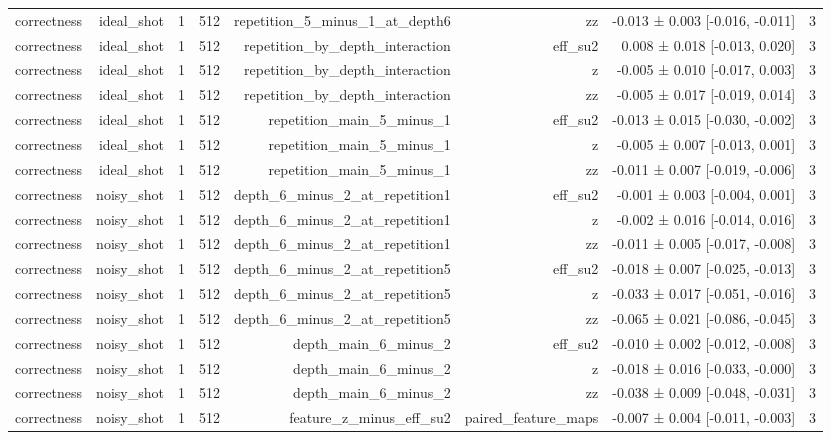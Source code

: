 \begin{table}
\begin{tabular}{lrrrrrrr}
correctness & ideal\_shot & 1 & 512 & repetition\_5\_minus\_1\_at\_depth6 & zz & -0.013 ± 0.003 [-0.016, -0.011] & 3 \\
correctness & ideal\_shot & 1 & 512 & repetition\_by\_depth\_interaction & eff\_su2 & 0.008 ± 0.018 [-0.013, 0.020] & 3 \\
correctness & ideal\_shot & 1 & 512 & repetition\_by\_depth\_interaction & z & -0.005 ± 0.010 [-0.017, 0.003] & 3 \\
correctness & ideal\_shot & 1 & 512 & repetition\_by\_depth\_interaction & zz & -0.005 ± 0.017 [-0.019, 0.014] & 3 \\
correctness & ideal\_shot & 1 & 512 & repetition\_main\_5\_minus\_1 & eff\_su2 & -0.013 ± 0.015 [-0.030, -0.002] & 3 \\
correctness & ideal\_shot & 1 & 512 & repetition\_main\_5\_minus\_1 & z & -0.005 ± 0.007 [-0.013, 0.001] & 3 \\
correctness & ideal\_shot & 1 & 512 & repetition\_main\_5\_minus\_1 & zz & -0.011 ± 0.007 [-0.019, -0.006] & 3 \\
correctness & noisy\_shot & 1 & 512 & depth\_6\_minus\_2\_at\_repetition1 & eff\_su2 & -0.001 ± 0.003 [-0.004, 0.001] & 3 \\
correctness & noisy\_shot & 1 & 512 & depth\_6\_minus\_2\_at\_repetition1 & z & -0.002 ± 0.016 [-0.014, 0.016] & 3 \\
correctness & noisy\_shot & 1 & 512 & depth\_6\_minus\_2\_at\_repetition1 & zz & -0.011 ± 0.005 [-0.017, -0.008] & 3 \\
correctness & noisy\_shot & 1 & 512 & depth\_6\_minus\_2\_at\_repetition5 & eff\_su2 & -0.018 ± 0.007 [-0.025, -0.013] & 3 \\
correctness & noisy\_shot & 1 & 512 & depth\_6\_minus\_2\_at\_repetition5 & z & -0.033 ± 0.017 [-0.051, -0.016] & 3 \\
correctness & noisy\_shot & 1 & 512 & depth\_6\_minus\_2\_at\_repetition5 & zz & -0.065 ± 0.021 [-0.086, -0.045] & 3 \\
correctness & noisy\_shot & 1 & 512 & depth\_main\_6\_minus\_2 & eff\_su2 & -0.010 ± 0.002 [-0.012, -0.008] & 3 \\
correctness & noisy\_shot & 1 & 512 & depth\_main\_6\_minus\_2 & z & -0.018 ± 0.016 [-0.033, -0.000] & 3 \\
correctness & noisy\_shot & 1 & 512 & depth\_main\_6\_minus\_2 & zz & -0.038 ± 0.009 [-0.048, -0.031] & 3 \\
correctness & noisy\_shot & 1 & 512 & feature\_z\_minus\_eff\_su2 & paired\_feature\_maps & -0.007 ± 0.004 [-0.011, -0.003] & 3 \\

\end{tabular}
\end{table}

